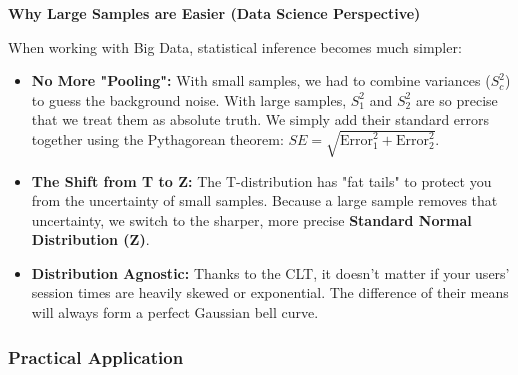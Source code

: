 \vspace{0.2cm}
\begin{example}{\textbf{Why Large Samples are Easier (Data Science Perspective)}}

When working with Big Data, statistical inference becomes much simpler:

\begin{itemize}
    \item \textbf{No More "Pooling":} With small samples, we had to combine variances ($S_c^2$) to guess the background noise. With large samples, $S_1^2$ and $S_2^2$ are so precise that we treat them as absolute truth. We simply add their standard errors together using the Pythagorean theorem: $SE = \sqrt{\text{Error}_1^2 + \text{Error}_2^2}$.
    \item \textbf{The Shift from T to Z:} The T-distribution has "fat tails" to protect you from the uncertainty of small samples. Because a large sample removes that uncertainty, we switch to the sharper, more precise \textbf{Standard Normal Distribution (Z)}.
    \item \textbf{Distribution Agnostic:} Thanks to the CLT, it doesn't matter if your users' session times are heavily skewed or exponential. The difference of their means will always form a perfect Gaussian bell curve.
\end{itemize}
\end{example}

\subsubsection{Practical Application}

